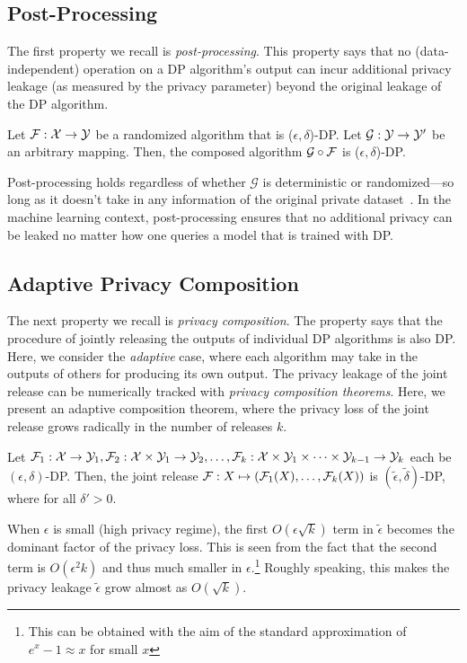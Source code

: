 \subsection{Post-Processing}
The first property we recall is \emph{post-processing}.
This property says that no (data-independent) operation on a DP algorithm's output can incur additional privacy leakage (as measured by the privacy parameter) beyond the original leakage of the DP algorithm.
\begin{prop}
Let $\mathcal{F}: \mathcal{X} \to \mathcal{Y}$ be a randomized algorithm that is ($\epsilon, \delta$)-DP.
Let $\mathcal{G}: \mathcal{Y} \to \mathcal{Y}'$ be an arbitrary mapping. 
Then, the composed algorithm $\mathcal{G} \circ \mathcal{F}$ is ($\epsilon, \delta$)-DP.
\end{prop}
Post-processing holds regardless of whether $\mathcal{G}$ is deterministic or randomized---so long as it doesn't take in any information of the original private dataset~\cite{dwork2014algorithmic}.
In the machine learning context, post-processing ensures that no additional privacy can be leaked no matter how one queries a model that is trained with DP.


\subsection{Adaptive Privacy Composition}
The next property we recall is \emph{privacy composition}.
The property says that the procedure of jointly releasing the outputs of individual DP algorithms is also DP.
Here, we consider the \emph{adaptive} case, where each algorithm may take in the outputs of others for producing its own output.
The privacy leakage of the joint release can be numerically tracked with \emph{privacy composition theorems}.
Here, we present an adaptive composition theorem, where the privacy loss of the joint release grows radically in the number of releases $k$.
\begin{theo}
Let $\mathcal{F}_1: \mathcal{X} \to \mathcal{Y}_1, \mathcal{F}_2: \mathcal{X} \times \mathcal{Y}_1 \to \mathcal{Y}_2, \dots, \mathcal{F}_k: \mathcal{X} \times \mathcal{Y}_1 \times \cdots \times \mathcal{Y}_{k-1} \to \mathcal{Y}_k$ each be $(\epsilon, \delta)$-DP.
Then, the joint release $\mathcal{F}: X \mapsto \left( \mathcal{F}_1(X), \dots, \mathcal{F}_k(X)\right)$ is $(\widetilde{\epsilon}, \widetilde{\delta})$-DP, where
for all $\delta' > 0$.
\end{theo}
When $\epsilon$ is small (high privacy regime), the first $O(\epsilon \sqrt{k})$ term in $\widetilde{\epsilon}$ becomes the dominant factor of the privacy loss. 
This is seen from the fact that the second term is $O(\epsilon^2 k)$ and thus much smaller in $\epsilon$.\footnote{This can be obtained with the aim of the standard approximation of $e^x - 1 \approx x$ for small $x$}
Roughly speaking, this makes the privacy leakage $\widetilde{\epsilon}$ grow almost as $O(\sqrt{k})$.

